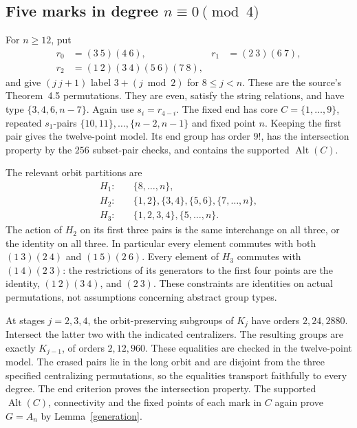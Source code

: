 \documentclass[11pt]{article}
\newcommand{\Alt}{\operatorname{Alt}}
\begin{document}
\subsection{Five marks in degree $n\equiv0\pmod4$}
For $n\geq12$, put
\begin{align*}
 r_0&=(3\ 5)(4\ 6),&
 r_1&=(2\ 3)(6\ 7),\\
 r_2&=(1\ 2)(3\ 4)(5\ 6)(7\ 8),
\end{align*}
and give $(j\ j+1)$ label $3+(j\bmod2)$ for $8\leq j<n$.
These are the source's Theorem~4.5 permutations. They are even, satisfy
the string relations, and have type $\{3,4,6,n-7\}$. Again use
$s_i=r_{4-i}$. The fixed end has core $C=\{1,\ldots,9\}$, repeated
$s_1$-pairs $\{10,11\},\ldots,\{n-2,n-1\}$ and fixed point $n$.
Keeping the first pair gives the twelve-point model. Its end group has
order $9!$, has the intersection property by the $256$ subset-pair
checks, and contains the supported $\Alt(C)$.

The relevant orbit partitions are
\begin{align*}
H_1:&\quad \{8,\ldots,n\},\\
H_2:&\quad \{1,2\},\{3,4\},\{5,6\},\{7,\ldots,n\},\\
H_3:&\quad \{1,2,3,4\},\{5,\ldots,n\}.
\end{align*}
The action of $H_2$ on its first three pairs is the same interchange
on all three, or the identity on all three. In particular every element
commutes with both $(1\ 3)(2\ 4)$ and $(1\ 5)(2\ 6)$.
Every element of $H_3$ commutes with $(1\ 4)(2\ 3)$: the restrictions
of its generators to the first four points are the identity,
$(1\ 2)(3\ 4)$, and $(2\ 3)$. These constraints are identities on
actual permutations, not assumptions concerning abstract group types.

At stages $j=2,3,4$, the orbit-preserving subgroups of $K_j$ have
orders $2,24,2880$. Intersect the latter two with the indicated
centralizers. The resulting groups are exactly $K_{j-1}$, of orders
$2,12,960$. These equalities are checked in the twelve-point model.
The erased pairs lie in the long orbit and are disjoint from the three
specified centralizing permutations, so the equalities transport
faithfully to every degree. The end criterion proves the intersection
property. The supported $\Alt(C)$, connectivity and the fixed points
of each mark in $C$ again prove $G=A_n$ by Lemma~\ref{generation}.
\end{document}
